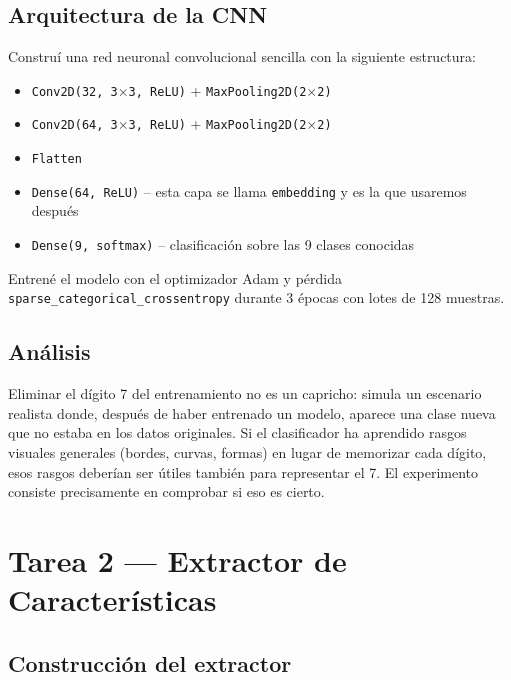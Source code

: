 \documentclass[../../__memoria.tex]{subfiles}
\begin{document}
\subsection{Arquitectura de la CNN}

Construí una red neuronal convolucional sencilla con la siguiente estructura:

\begin{itemize}
    \item \texttt{Conv2D(32, 3$\times$3, ReLU)} + \texttt{MaxPooling2D(2$\times$2)}
    \item \texttt{Conv2D(64, 3$\times$3, ReLU)} + \texttt{MaxPooling2D(2$\times$2)}
    \item \texttt{Flatten}
    \item \texttt{Dense(64, ReLU)} -- esta capa se llama \texttt{embedding} y es la que usaremos después
    \item \texttt{Dense(9, softmax)} -- clasificación sobre las 9 clases conocidas
\end{itemize}

Entrené el modelo con el optimizador Adam y pérdida \texttt{sparse\_categorical\_crossentropy} durante 3 épocas con lotes de 128 muestras.

\subsection{Análisis}

Eliminar el dígito 7 del entrenamiento no es un capricho: simula un escenario realista donde, después de haber entrenado un modelo, aparece una clase nueva que no estaba en los datos originales. Si el clasificador ha aprendido rasgos visuales generales (bordes, curvas, formas) en lugar de memorizar cada dígito, esos rasgos deberían ser útiles también para representar el 7. El experimento consiste precisamente en comprobar si eso es cierto.

\section[Tarea 2: Extractor]{Tarea 2 --- Extractor de Características}

\subsection{Construcción del extractor}
\end{document}
